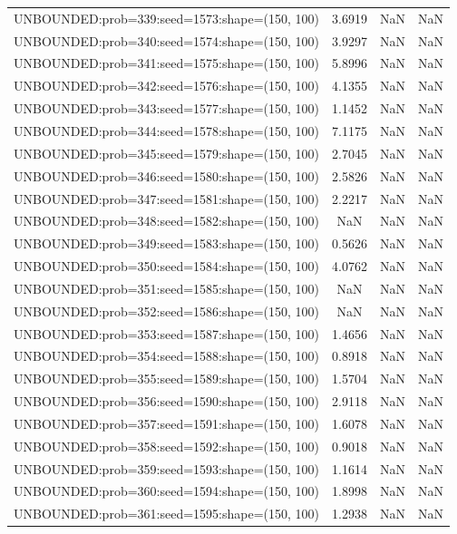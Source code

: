 \begin{longtable}{lccc}
UNBOUNDED:prob=339:seed=1573:shape=(150, 100) &  3.6919 &   NaN &    NaN \\
UNBOUNDED:prob=340:seed=1574:shape=(150, 100) &  3.9297 &   NaN &    NaN \\
UNBOUNDED:prob=341:seed=1575:shape=(150, 100) &  5.8996 &   NaN &    NaN \\
UNBOUNDED:prob=342:seed=1576:shape=(150, 100) &  4.1355 &   NaN &    NaN \\
UNBOUNDED:prob=343:seed=1577:shape=(150, 100) &  1.1452 &   NaN &    NaN \\
UNBOUNDED:prob=344:seed=1578:shape=(150, 100) &  7.1175 &   NaN &    NaN \\
UNBOUNDED:prob=345:seed=1579:shape=(150, 100) &  2.7045 &   NaN &    NaN \\
UNBOUNDED:prob=346:seed=1580:shape=(150, 100) &  2.5826 &   NaN &    NaN \\
UNBOUNDED:prob=347:seed=1581:shape=(150, 100) &  2.2217 &   NaN &    NaN \\
UNBOUNDED:prob=348:seed=1582:shape=(150, 100) &     NaN &   NaN &    NaN \\
UNBOUNDED:prob=349:seed=1583:shape=(150, 100) &  0.5626 &   NaN &    NaN \\
UNBOUNDED:prob=350:seed=1584:shape=(150, 100) &  4.0762 &   NaN &    NaN \\
UNBOUNDED:prob=351:seed=1585:shape=(150, 100) &     NaN &   NaN &    NaN \\
UNBOUNDED:prob=352:seed=1586:shape=(150, 100) &     NaN &   NaN &    NaN \\
UNBOUNDED:prob=353:seed=1587:shape=(150, 100) &  1.4656 &   NaN &    NaN \\
UNBOUNDED:prob=354:seed=1588:shape=(150, 100) &  0.8918 &   NaN &    NaN \\
UNBOUNDED:prob=355:seed=1589:shape=(150, 100) &  1.5704 &   NaN &    NaN \\
UNBOUNDED:prob=356:seed=1590:shape=(150, 100) &  2.9118 &   NaN &    NaN \\
UNBOUNDED:prob=357:seed=1591:shape=(150, 100) &  1.6078 &   NaN &    NaN \\
UNBOUNDED:prob=358:seed=1592:shape=(150, 100) &  0.9018 &   NaN &    NaN \\
UNBOUNDED:prob=359:seed=1593:shape=(150, 100) &  1.1614 &   NaN &    NaN \\
UNBOUNDED:prob=360:seed=1594:shape=(150, 100) &  1.8998 &   NaN &    NaN \\
UNBOUNDED:prob=361:seed=1595:shape=(150, 100) &  1.2938 &   NaN &    NaN \\

\end{longtable}
